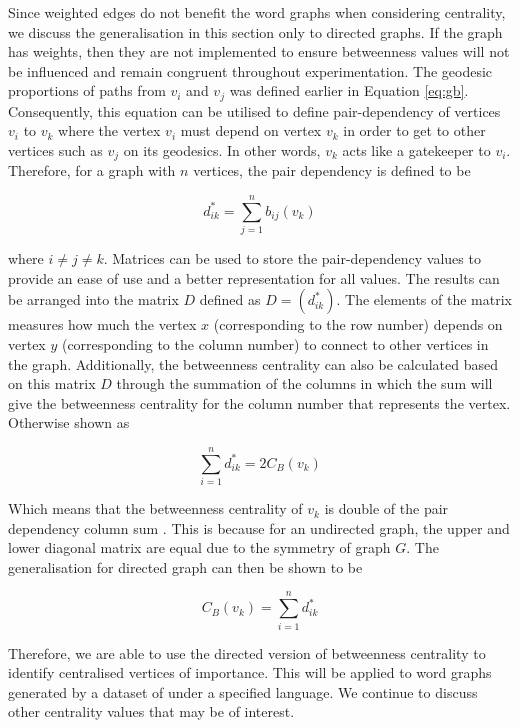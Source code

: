 Since weighted edges do not benefit the word graphs when considering centrality, we discuss the generalisation in this section only to directed graphs. If the graph has weights, then they are not implemented to ensure betweenness values will not be influenced and remain congruent throughout experimentation. The geodesic proportions of paths from $v_i$ and $v_j$ was defined earlier in Equation \ref{eq:gb}. Consequently, this equation can be utilised to define pair-dependency of vertices $v_i$ to $v_k$ where the vertex $v_i$ must depend on vertex $v_k$ in order to get to other vertices such as $v_j$ on its geodesics. In other words, $v_k$ acts like a gatekeeper to $v_i$. Therefore, for a graph with $n$ vertices, the pair dependency is defined to be 

\begin{equation}\label{eq:bcrmv}
d^*_{ik} = \sum_{j=1}^{n}b_{ij}(v_k)
\end{equation}

where $i \ne j \ne k$. Matrices can be used to store the pair-dependency values to provide an ease of use and a better representation for all values. The results can be arranged into the matrix $D$ defined as $D = (d^*_{ik})$. The elements of the matrix measures how much the vertex $x$ (corresponding to the row number) depends on vertex $y$ (corresponding to the column number) to connect to other vertices in the graph. Additionally, the betweenness centrality can also be calculated based on this matrix $D$ through the summation of the columns in which the sum will give the betweenness centrality for the column number that represents the vertex. Otherwise shown as

\begin{equation}
\sum_{i=1}^nd^*_{ik} = 2C_B(v_k)
\end{equation}

Which means that the betweenness centrality of $v_k$ is double of the pair dependency column sum \cite{white1994betweenness}. This is because for an undirected graph, the upper and lower diagonal matrix are equal due to the symmetry of graph $G$. The generalisation for directed graph can then be shown to be

\begin{equation}
C_B(v_k) = \sum_{i=1}^nd^*_{ik}
\end{equation}

Therefore, we are able to use the directed version of betweenness centrality to identify centralised vertices of importance. This will be applied to word graphs generated by a dataset of under a specified language. We continue to discuss other centrality values that may be of interest.

